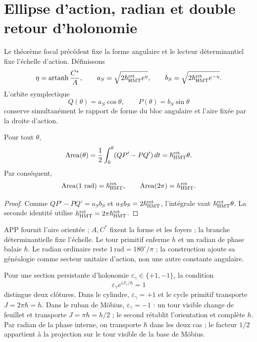 \section{Ellipse d'action, radian et double retour d'holonomie}
\label{sec:elipse-accion-holonomia-rev8}

Le théorème focal précédent fixe la forme angulaire et le lecteur déterminantiel
fixe l'échelle d'action. Définissons
\[
 \eta=\operatorname{artanh}\frac{C^*}{A},
 \qquad
 a_S=\sqrt{2\hbar_{\rm HMT}^{\rm ret}e^\eta},
 \qquad
 b_S=\sqrt{2\hbar_{\rm HMT}^{\rm ret}e^{-\eta}}.
\]
L'orbite symplectique
\[
 Q(\theta)=a_S\cos\theta,
 \qquad
 P(\theta)=b_S\sin\theta
\]
conserve simultanément le rapport de forme du bloc angulaire et l'aire
fixée par la droite d'action.

\begin{theorem}
\label{thm:area-fase-elipse-rev8}
Pour tout \(\theta\),
\[
 \operatorname{Area}(\theta)
 =\frac12\int_0^\theta(QP'-PQ')\,dt
 =\hbar_{\rm HMT}^{\rm ret}\theta.
\]
Par conséquent,
\[
 \operatorname{Area}(1\ {\rm rad})=\hbar_{\rm HMT}^{\rm ret},
 \qquad
 \operatorname{Area}(2\pi)=h_{\rm HMT}^{\rm ret}.
\]
\end{theorem}

\begin{proof}
Comme \(QP'-PQ'=a_Sb_S\) et
\(a_Sb_S=2\hbar_{\rm HMT}^{\rm ret}\), l'intégrale vaut
\(\hbar_{\rm HMT}^{\rm ret}\theta\). La seconde identité utilise
\(h_{\rm HMT}^{\rm ret}=2\pi\hbar_{\rm HMT}^{\rm ret}\).
\end{proof}

APP fournit l'aire orientée ; \(A,C^*\) fixent la forme et les foyers ; la branche
déterminantielle fixe l'échelle. Le tour primitif enferme \(h\) et un radian
de phase balaie \(\hbar\). Le radian ordinaire reste
\(1\,\mathrm{rad}=180^\circ/\pi\) ; la construction ajoute sa généalogie comme
secteur unitaire d'action, non une autre constante angulaire.

Pour une section persistante d'holonomie
\(\varepsilon_\gamma\in\{+1,-1\}\), la condition
\[
 \varepsilon_\gamma e^{iJ_\gamma/\hbar}=1
\]
distingue deux clôtures. Dans le cylindre, \(\varepsilon_\gamma=+1\) et le cycle
primitif transporte \(J=2\pi\hbar=h\). Dans le ruban de Möbius,
\(\varepsilon_\gamma=-1\) : un tour visible change de feuillet et transporte
\(J=\pi\hbar=h/2\) ; le second rétablit l'orientation et complète \(h\). Par
radian de la phase interne, on transporte \(\hbar\) dans les deux cas ; le facteur
\(1/2\) appartient à la projection sur le tour visible de la base de Möbius.

